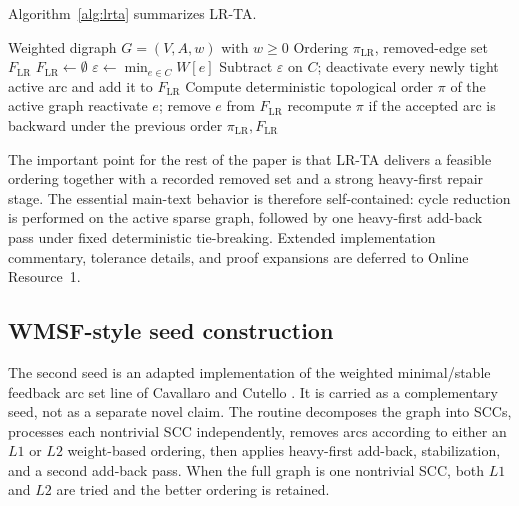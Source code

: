 Algorithm~\ref{alg:lrta} summarizes LR-TA.

\begin{algorithm}[t]
\caption{LR-TA seed construction}
\label{alg:lrta}
\footnotesize
\begin{algorithmic}[1]
\Require Weighted digraph \(G=(V,A,w)\) with \(w\ge 0\)
\Ensure Ordering \(\pi_{\mathrm{LR}}\), removed-edge set \(F_{\mathrm{LR}}\)
\State \(F_{\mathrm{LR}} \gets \emptyset\)
    \State \(\varepsilon \gets \min_{e\in C} W[e]\)
    \State Subtract \(\varepsilon\) on \(C\); deactivate every newly tight active arc and add it to \(F_{\mathrm{LR}}\)
\EndWhile
\State Compute deterministic topological order \(\pi\) of the active graph
        \State reactivate \(e\); remove \(e\) from \(F_{\mathrm{LR}}\)
        \State recompute \(\pi\) if the accepted arc is backward under the previous order
    \EndIf
\EndFor
\State \Return \(\pi_{\mathrm{LR}}, F_{\mathrm{LR}}\)
\end{algorithmic}
\end{algorithm}

The important point for the rest of the paper is that LR-TA delivers a feasible ordering together with a recorded removed set and a strong heavy-first repair stage. The essential main-text behavior is therefore self-contained: cycle reduction is performed on the active sparse graph, followed by one heavy-first add-back pass under fixed deterministic tie-breaking. Extended implementation commentary, tolerance details, and proof expansions are deferred to Online Resource~1.

\subsection{WMSF-style seed construction}
\label{subsec:wmsf}

The second seed is an adapted implementation of the weighted minimal/stable feedback arc set line of Cavallaro and Cutello \cite{CC25}. It is carried as a complementary seed, not as a separate novel claim. The routine decomposes the graph into SCCs, processes each nontrivial SCC independently, removes arcs according to either an \(L1\) or \(L2\) weight-based ordering, then applies heavy-first add-back, stabilization, and a second add-back pass. When the full graph is one nontrivial SCC, both \(L1\) and \(L2\) are tried and the better ordering is retained.

